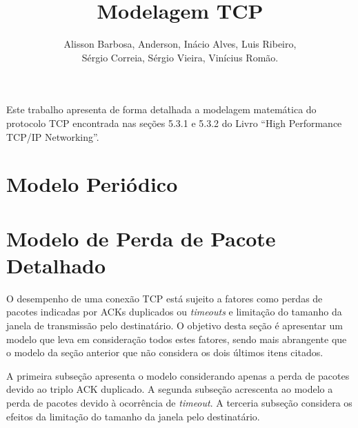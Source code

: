 \documentclass[12pt]{article}
\title{Modelagem TCP}
\author{Alisson Barbosa, Anderson, Inácio Alves, Luis Ribeiro,\\
 Sérgio Correia, Sérgio Vieira, Vinícius Romão.}
\begin{document}
 

\maketitle

     
\begin{resumo} 
  Este trabalho apresenta de forma detalhada a modelagem matemática do protocolo
  TCP encontrada nas seções 5.3.1 e 5.3.2 do Livro ``High Performance TCP/IP Networking''\cite{hassan2004high}.
\end{resumo}


\section{Modelo Periódico}



\section{Modelo de Perda de Pacote Detalhado}
O desempenho de uma conexão TCP está sujeito a fatores como perdas de pacotes indicadas por 
ACKs duplicados ou \textit{timeouts} e limitação do tamanho da janela de transmissão pelo 
destinatário. O objetivo desta seção é apresentar um modelo que leva em consideração todos 
estes fatores, sendo mais abrangente que o modelo da seção anterior que não considera os dois
últimos itens citados.

A primeira subseção apresenta o modelo considerando apenas a perda de pacotes devido ao 
triplo ACK duplicado. A segunda subseção acrescenta ao modelo a perda de pacotes devido à
ocorrência de \textit{timeout}. A terceria subseção considera os efeitos da limitação do 
tamanho da janela pelo destinatário.




\end{document}
